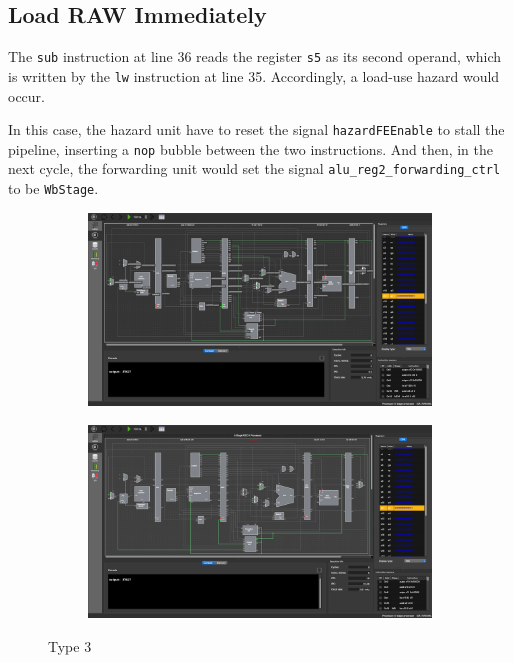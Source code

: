 \documentclass[12pt, a4paper]{article}
\begin{document}
\subsection{Load RAW Immediately}

The \texttt{sub} instruction at line 36 reads the register \texttt{s5} as its second operand, which is written by the \texttt{lw} instruction at line 35. Accordingly, a load-use hazard would occur.

In this case, the hazard unit have to reset the signal \texttt{hazardFEEnable} to stall the pipeline, inserting a \texttt{nop} bubble between the two instructions. And then, in the next cycle, the forwarding unit would set the signal \texttt{alu\_reg2\_forwarding\_ctrl} to be \texttt{WbStage}.

\begin{figure}[htbp]
\begin{subfigure}{\linewidth}
\centering
\includegraphics[width=.88\linewidth]{3a}
\caption{}
\label{fig:3a}
\end{subfigure}
\begin{subfigure}{\linewidth}
\centering
\includegraphics[width=.88\linewidth]{3b}
\caption{}
\label{fig:3b}
\end{subfigure}
\caption{Type 3}
\label{fig:3}
\end{figure}
\end{document}
